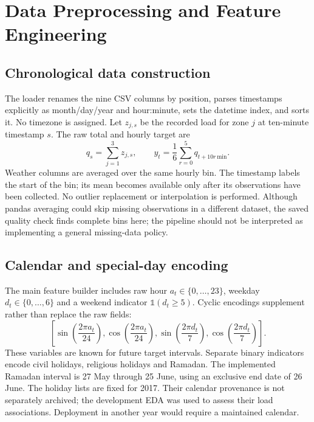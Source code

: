 \section{Data Preprocessing and Feature Engineering}\label{sec:features}
\subsection{Chronological data construction}
The loader renames the nine CSV columns by position, parses timestamps explicitly as month/day/year and hour:minute, sets the datetime index, and sorts it. No timezone is assigned. Let $z_{j,s}$ be the recorded load for zone $j$ at ten-minute timestamp $s$. The raw total and hourly target are
\begin{equation}
q_s=\sum_{j=1}^{3}z_{j,s},\qquad
y_t=\frac{1}{6}\sum_{r=0}^{5}q_{t+10r\,\mathrm{min}}.
\label{eq:target}
\end{equation}
Weather columns are averaged over the same hourly bin. The timestamp labels the start of the bin; its mean becomes available only after its observations have been collected. No outlier replacement or interpolation is performed. Although pandas averaging could skip missing observations in a different dataset, the saved quality check finds complete bins here; the pipeline should not be interpreted as implementing a general missing-data policy.

\subsection{Calendar and special-day encoding}
The main feature builder includes raw hour $a_t\in\{0,\ldots,23\}$, weekday $d_t\in\{0,\ldots,6\}$ and a weekend indicator $\mathbb{1}(d_t\ge5)$. Cyclic encodings supplement rather than replace the raw fields:
\begin{equation}
\left[\sin\!\left(\frac{2\pi a_t}{24}\right),\cos\!\left(\frac{2\pi a_t}{24}\right),
\sin\!\left(\frac{2\pi d_t}{7}\right),\cos\!\left(\frac{2\pi d_t}{7}\right)\right].
\label{eq:calendar}
\end{equation}
These variables are known for future target intervals. Separate binary indicators encode civil holidays, religious holidays and Ramadan. The implemented Ramadan interval is 27 May through 25 June, using an exclusive end date of 26 June. The holiday lists are fixed for 2017. Their calendar provenance is not separately archived; the development EDA was used to assess their load associations. Deployment in another year would require a maintained calendar.

